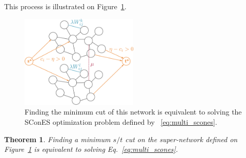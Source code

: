 \documentclass[12pt,a4paper]{article}
\newtheorem{thm}{Theorem}
\begin{document}
This process is illustrated on Figure~\ref{fig:mincut_multiscones}.\\

\begin{figure}[h]
  \centering
  \includegraphics[width=0.5\textwidth]{figures/mincut_multiscones}
  \caption{Finding the minimum cut of this network is equivalent to solving the SConES optimization problem defined by ~\ref{eq:multi_scones}.}
  \label{fig:mincut_multiscones}
\end{figure}

\begin{thm}
  Finding a minimum $s/t$ cut on the super-network defined on Figure~\ref{fig:mincut_multiscones} is equivalent to solving Eq.~\ref{eq:multi_scones}.
\end{thm}
\end{document}
